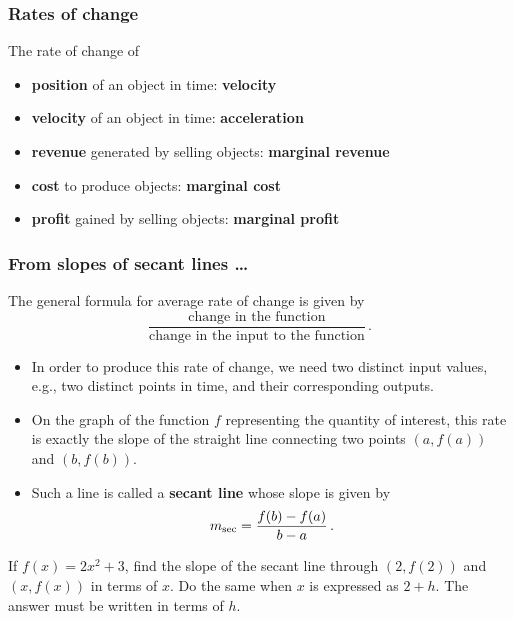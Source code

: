 \documentclass[10pt,t,presentation,ignorenonframetext,aspectratio=169]{beamer}
\title[\course]{\lecTitle}
\institute[Ohio State]
{
  \medskip
}
\date[\week]{\semester}
\author{Tae Eun Kim, Ph.D.}
\begin{document}
\begin{frame}
  \titlepage
\end{frame}

\begin{frame}
  \frametitle{Rates of change}
  The rate of change of
  \begin{itemize}
  \item \textbf{position} of an object in time: \textbf{velocity}
  \item \textbf{velocity} of an object in time: \textbf{acceleration}
  \item \textbf{revenue} generated by selling objects: \textbf{marginal revenue} %
  \item \textbf{cost} to produce objects: \textbf{marginal cost} %
  \item \textbf{profit}  gained by selling objects: \textbf{marginal
      profit} %
  \end{itemize}
\end{frame}

\begin{frame}
  \frametitle{From slopes of secant lines \ldots}
  The general formula for average rate of change is given by
  \[
    \frac{ \text{change in the function} }{ \text{change in the input to the function} } \,.
  \]
  \begin{itemize}
  \item In order to produce this rate of change, we need two distinct
    input values, e.g., two distinct points in time, and their corresponding outputs.
  \item  On the graph of the function $f$ representing the quantity of
    interest, this rate is exactly the slope of the straight line
    connecting two points $(a, f(a))$ and $(b, f(b))$.
  \item Such a line is called a \textbf{secant line} whose slope is given by
    \[
      m_{\rm sec}
      = \frac{f(b) - f(a)}{b - a} \,.
    \]
  \end{itemize}
\end{frame}

\begin{frame}
  \vs
  \begin{question}
    If $f(x) = 2x^2 + 3$, find the slope of the secant line through $(2, f(2))$ and $(x, f(x))$ in terms of $x$. Do the same when $x$ is expressed as $2+h$. The answer must be written in terms of $h$.
  \end{question}
\end{frame}
\end{document}
